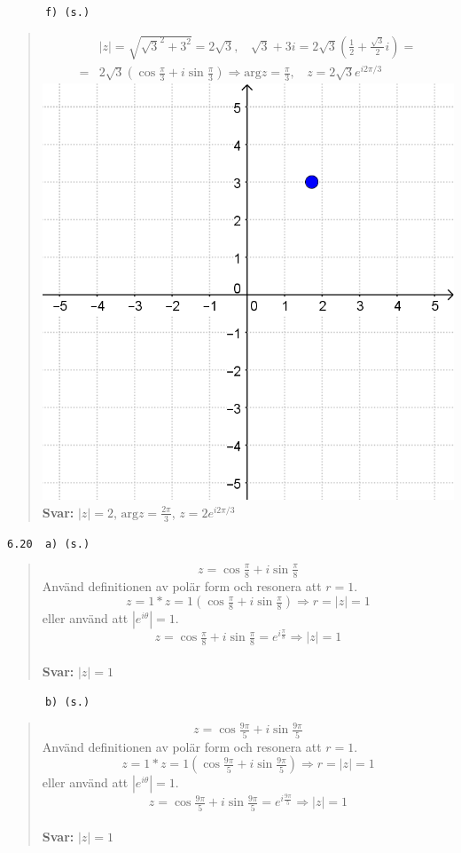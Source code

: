 \documentclass[a4paper]{article}
\newcommand{\tskcol}[1]{\textcolor{tskcol}{#1}}
\begin{document}
	\pagebreak
	\texttt{\tskcol{~~~~~~f) (s.)}}
	\begin{quotation}
		\noindent
		\begin{align*}
		&|z|=\sqrt{\sqrt{3}^2+3^2}=2\sqrt{3},~~~~ \sqrt{3}+3i=2\sqrt{3}(\frac{1}{2}+\frac{\sqrt{3}}{2}i)= \\ =
		&2\sqrt{3}(\cos\frac{\pi}{3}+i\sin\frac{\pi}{3}) \Rightarrow \text{arg}z=\frac{\pi}{3},~~~~ z=2\sqrt{3}e^{i2\pi/3}
		\end{align*}
		\includegraphics[scale=0.2]{images/619f.PNG}
		\\
		\textbf{Svar:} $|z|=2$, $\text{arg}z=\frac{2\pi}{3}$, $z=2e^{i2\pi/3}$
	\end{quotation}
	
	\texttt{\tskcol{6.20~~a) (s.)}}
	\begin{quotation}
		\noindent
		\[z=\cos\tfrac{\pi}{8}+i\sin\tfrac{\pi}{8}\]
		Använd definitionen av polär form och resonera att $r=1$.
		\[z=
		1*z=
		1(\cos\tfrac{\pi}{8}+i\sin\tfrac{\pi}{8})\Rightarrow
		r=|z|=1\]
		eller använd att $\left|e^{i\theta}\right|=1$.
		\[z=
		\cos\tfrac{\pi}{8}+i\sin\tfrac{\pi}{8}=
		e^{i\tfrac{\pi}{8}} \Rightarrow
		|z|=1\]
		\\
		\textbf{Svar:} $|z|=1$
	\end{quotation}
	
	\texttt{\tskcol{~~~~~~b) (s.)}}
	\begin{quotation}
		\noindent
		\[z=\cos\tfrac{9\pi}{5}+i\sin\tfrac{9\pi}{5}\]
		Använd definitionen av polär form och resonera att $r=1$.
		\[z=
		1*z=
		1(\cos\tfrac{9\pi}{5}+i\sin\tfrac{9\pi}{5})\Rightarrow
		r=|z|=1\]
		eller använd att $\left|e^{i\theta}\right|=1$.
		\[z=
		\cos\tfrac{9\pi}{5}+i\sin\tfrac{9\pi}{5}=
		e^{i\tfrac{9\pi}{5}} \Rightarrow
		|z|=1\]
		\\
		\textbf{Svar:} $|z|=1$
	\end{quotation}
	
\end{document}
